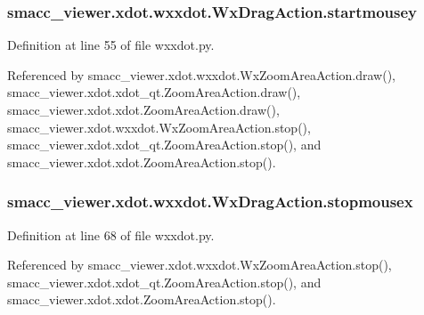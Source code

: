 \subsubsection[{\texorpdfstring{startmousey}{startmousey}}]{\setlength{\rightskip}{0pt plus 5cm}smacc\+\_\+viewer.\+xdot.\+wxxdot.\+Wx\+Drag\+Action.\+startmousey}\hypertarget{classsmacc__viewer_1_1xdot_1_1wxxdot_1_1WxDragAction_aedaff0c78a207d753acc62fe3a7c2aa9}{}\label{classsmacc__viewer_1_1xdot_1_1wxxdot_1_1WxDragAction_aedaff0c78a207d753acc62fe3a7c2aa9}


Definition at line 55 of file wxxdot.\+py.



Referenced by smacc\+\_\+viewer.\+xdot.\+wxxdot.\+Wx\+Zoom\+Area\+Action.\+draw(), smacc\+\_\+viewer.\+xdot.\+xdot\+\_\+qt.\+Zoom\+Area\+Action.\+draw(), smacc\+\_\+viewer.\+xdot.\+xdot.\+Zoom\+Area\+Action.\+draw(), smacc\+\_\+viewer.\+xdot.\+wxxdot.\+Wx\+Zoom\+Area\+Action.\+stop(), smacc\+\_\+viewer.\+xdot.\+xdot\+\_\+qt.\+Zoom\+Area\+Action.\+stop(), and smacc\+\_\+viewer.\+xdot.\+xdot.\+Zoom\+Area\+Action.\+stop().

\subsubsection[{\texorpdfstring{stopmousex}{stopmousex}}]{\setlength{\rightskip}{0pt plus 5cm}smacc\+\_\+viewer.\+xdot.\+wxxdot.\+Wx\+Drag\+Action.\+stopmousex}\hypertarget{classsmacc__viewer_1_1xdot_1_1wxxdot_1_1WxDragAction_a56d7abcb5e97543ba31cd1f0c894c66e}{}\label{classsmacc__viewer_1_1xdot_1_1wxxdot_1_1WxDragAction_a56d7abcb5e97543ba31cd1f0c894c66e}


Definition at line 68 of file wxxdot.\+py.



Referenced by smacc\+\_\+viewer.\+xdot.\+wxxdot.\+Wx\+Zoom\+Area\+Action.\+stop(), smacc\+\_\+viewer.\+xdot.\+xdot\+\_\+qt.\+Zoom\+Area\+Action.\+stop(), and smacc\+\_\+viewer.\+xdot.\+xdot.\+Zoom\+Area\+Action.\+stop().

